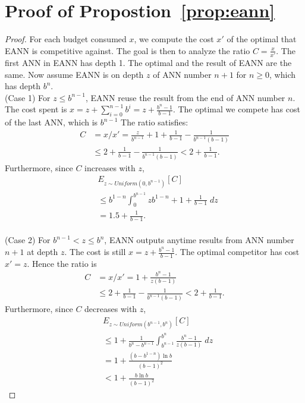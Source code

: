 %
%
%
%
%



\section{Proof of Propostion~\ref{prop:eann}}
\begin{proof}
For each budget consumed $x$, we compute the cost $x'$ of the optimal that EANN is competitive against. The goal is then to analyze the ratio $C = \frac{x}{x'}$. 
The first ANN in EANN has depth 1. The optimal and the result of EANN are the same. Now assume EANN is on depth $z$ of ANN number $n+1$ for $n\geq 0$, which has depth $b^{n}$. \\
(Case 1) For $z \leq b^{n-1}$, EANN reuse the result from the end of ANN number $n$. 
The cost spent is $x = z + \sum _{i=0}^{n-1} b^i = z + \frac{b^n-1}{b-1}$. 
The optimal we compete has cost of the last ANN, which is $b^{n-1}$
The ratio satisfies:
\begin{align*} 
C &= x / x' = \frac{z}{b^{n-1}} + 1 + \frac{1}{b-1} - \frac{1}{b^{n-1}(b-1)} \\
&\leq 2 + \frac{1}{b-1} - \frac{1}{b^{n-1}(b-1)} 
< 2+ \frac{1}{b-1}. 
\end{align*}
Furthermore, since $C$ increases with $z$, 
\begin{align*}
&E_{z \sim Uniform(0, b^{n-1})}[C] \\
&\leq b^{1-n} \int _0 ^{b^{n-1}} 
    z b^{1-n}+ 1 + \frac{1}{b-1} \;dz \\
&= 1.5 + \frac{1}{b-1}.
\end{align*}
\\
(Case 2) For $b^{n-1} < z \leq b^n$, EANN outputs anytime results from ANN number $n+1$ at depth $z$. 
The cost is still $x = z +\frac{b^n-1}{b-1}$. The optimal competitor has cost $x' = z$.  Hence the ratio is 
\begin{align*}
C &= x/ x' = 1 + \frac{b^n-1}{z(b-1)} \\
&\leq 2 + \frac{1}{b-1} - \frac{1}{b^{n-1}(b-1)} 
< 2+ \frac{1}{b-1}.
\end{align*}
Furthermore, since $C$ decreases with $z$, 
\begin{align*}
&E_{z \sim Uniform(b^{n-1}, b^n)}[C] \\
& \leq 1 +  
   \frac{1}{b^n - b^{n-1}} \int _{b^{n-1}} ^{b^{n}} 
        \frac{b^n -1}{z(b-1)} \; dz  \\
&= 1 + \frac{(b - b^{1-n}) \ln{b}}{(b-1)^2} \\
&< 1 + \frac{b \ln{b}}{(b-1)^2} 
\end{align*}


\end{proof}
